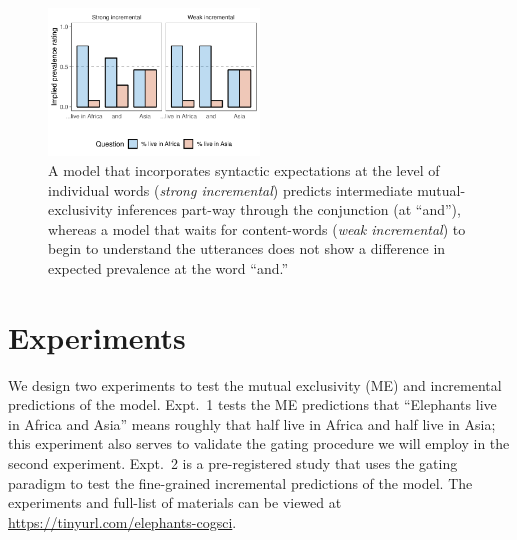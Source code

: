 \documentclass[10pt,letterpaper]{article}
\providecommand{\tightlist}{%
  \setlength{\itemsep}{0pt}\setlength{\parskip}{0pt}}
\newcommand{\denote}[1]{\mbox{ $[\![ #1 ]\!]$}}
\begin{document}
\begin{figure}[t]
  \centering
    \includegraphics[width=0.5\textwidth]{incremental}
    \vspace{-1cm}
  \caption{A model that incorporates syntactic expectations at the level of individual words (\emph{strong incremental}) predicts intermediate mutual-exclusivity inferences part-way through the conjunction (at ``and''), whereas a model that waits for content-words (\emph{weak incremental}) to begin to understand the utterances does not show a difference in expected prevalence at the word ``and.''
  }
          \vspace{-0.5cm}
  \label{fig:incremental}
\end{figure}


%


\section{Experiments}

We design two experiments to test the mutual exclusivity (ME) and incremental predictions of the model. 
Expt.~1 tests the ME predictions that ``Elephants live in Africa and Asia'' means roughly that half live in Africa and half live in Asia; this experiment also serves to validate the gating procedure we will employ in the second experiment. 
Expt.~2 is a pre-registered study that uses the gating paradigm to test the fine-grained incremental predictions of the model.
The experiments and full-list of materials can be viewed at \url{https://tinyurl.com/elephants-cogsci}.
\end{document}
